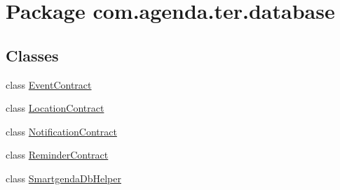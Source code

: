\hypertarget{namespacecom_1_1agenda_1_1ter_1_1database}{\section{Package com.\-agenda.\-ter.\-database}
\label{namespacecom_1_1agenda_1_1ter_1_1database}
}
\subsection*{Classes}
\begin{DoxyCompactItemize}
\item 
class \hyperlink{classcom_1_1agenda_1_1ter_1_1database_1_1_event_contract}{Event\-Contract}
\item 
class \hyperlink{classcom_1_1agenda_1_1ter_1_1database_1_1_location_contract}{Location\-Contract}
\item 
class \hyperlink{classcom_1_1agenda_1_1ter_1_1database_1_1_notification_contract}{Notification\-Contract}
\item 
class \hyperlink{classcom_1_1agenda_1_1ter_1_1database_1_1_reminder_contract}{Reminder\-Contract}
\item 
class \hyperlink{classcom_1_1agenda_1_1ter_1_1database_1_1_smartgenda_db_helper}{Smartgenda\-Db\-Helper}
\end{DoxyCompactItemize}
